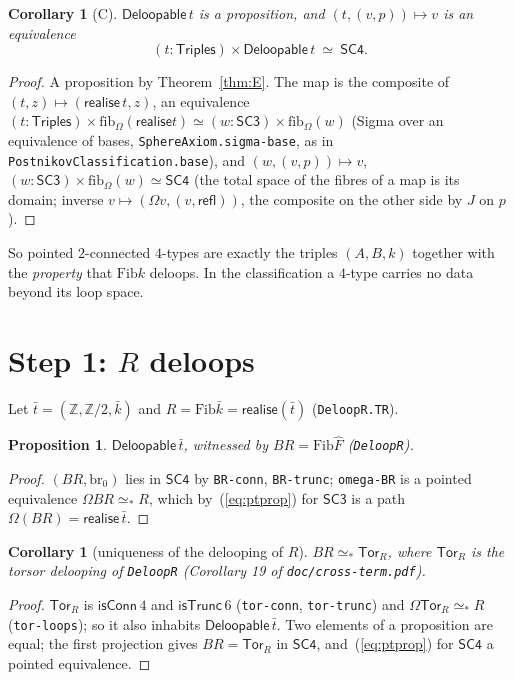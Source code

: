 \documentclass[11pt]{amsart}
\newtheorem{proposition}[theorem]{Proposition}
\newtheorem{corollary}[theorem]{Corollary}
\theoremstyle{definition}
\theoremstyle{remark}
\newcommand{\Om}{\Omega}
\newcommand{\code}[1]{\texttt{#1}}
\newcommand{\cT}{\mathsf{isTrunc}}
\newcommand{\cC}{\mathsf{isConn}}
\newcommand{\refl}{\mathsf{refl}}
\newcommand{\Fib}{\mathrm{Fib}}
\newcommand{\fib}{\mathrm{fib}}
\newcommand{\Tor}{\mathsf{Tor}}
\newcommand{\SCt}{\mathsf{SC3}}
\newcommand{\SCf}{\mathsf{SC4}}
\newcommand{\Tri}{\mathsf{Triples}}
\newcommand{\Del}{\mathsf{Deloopable}}
\newcommand{\real}{\mathsf{realise}}
\newcommand{\pteq}{\simeq_*}
\newcommand{\Z}{\mathbb{Z}}
\begin{document}
\begin{corollary}[C]\label{cor:C}
$\Del\,t$ is a proposition, and $(t,(v,p))\mapsto v$ is an equivalence
\[
  (t:\Tri)\times\Del\,t\ \simeq\ \SCf .
\]
\end{corollary}
\begin{proof}
A proposition by Theorem~\ref{thm:E}. The map is the composite of
$(t,z)\mapsto(\real\,t,z)$, an equivalence $(t:\Tri)\times\fib_\Om(\real t)\simeq
(w:\SCt)\times\fib_\Om(w)$ (Sigma over an equivalence of bases,
\code{SphereAxiom.sigma-base}, as in \code{PostnikovClassification.base}), and
$(w,(v,p))\mapsto v$, $(w:\SCt)\times\fib_\Om(w)\simeq\SCf$ (the total space of the
fibres of a map is its domain; inverse $v\mapsto(\Om v,(v,\refl))$, the
composite on the other side by $J$ on $p$).
\end{proof}

\noindent So pointed $2$-connected $4$-types are exactly the triples $(A,B,k)$
together with the \emph{property} that $\Fib k$ deloops. In the classification a
$4$-type carries no data beyond its loop space.

\section{Step 1: $R$ deloops}

Let $\bar t=(\Z,\Z/2,\bar k)$ and $R=\Fib\bar k=\real(\bar t)$
(\code{DeloopR.TR}).

\begin{proposition}
$\Del\,\bar t$, witnessed by $BR=\Fib\hat F$ (\code{DeloopR}).
\end{proposition}
\begin{proof}
$(BR,\mathrm{br}_0)$ lies in $\SCf$ by \code{BR-conn}, \code{BR-trunc};
\code{omega-BR} is a pointed equivalence $\Om BR\pteq R$, which
by~(\ref{eq:ptprop}) for $\SCt$ is a path $\Om(BR)=\real\,\bar t$.
\end{proof}

\begin{corollary}[uniqueness of the delooping of $R$]
$BR\pteq\Tor_R$, where $\Tor_R$ is the torsor delooping of
\code{DeloopR} (Corollary 19 of \code{doc/cross-term.pdf}).
\end{corollary}
\begin{proof}
$\Tor_R$ is $\cC\,4$ and $\cT\,6$ (\code{tor-conn}, \code{tor-trunc}) and
$\Om\Tor_R\pteq R$ (\code{tor-loops}); so it also inhabits $\Del\,\bar t$. Two
elements of a proposition are equal; the first projection gives
$BR=\Tor_R$ in $\SCf$, and~(\ref{eq:ptprop}) for $\SCf$ a pointed equivalence.
\end{proof}
\end{document}

